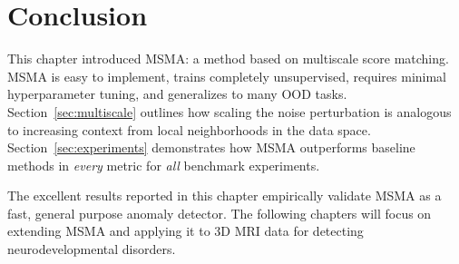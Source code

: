 
\section{Conclusion}

This chapter introduced MSMA: a method based on multiscale score matching. MSMA is easy to implement, trains completely unsupervised, requires minimal hyperparameter tuning, and generalizes to many OOD tasks. Section~\ref{sec:multiscale} outlines how scaling the noise perturbation is analogous to increasing context from local neighborhoods in the data space.
Section~\ref{sec:experiments} demonstrates how MSMA outperforms baseline methods in \textit{every} metric for \textit{all} benchmark experiments. 

The excellent results reported in this chapter empirically validate MSMA as a fast, general purpose anomaly detector. The following chapters will focus on extending MSMA and applying it to 3D MRI data for detecting neurodevelopmental disorders.



